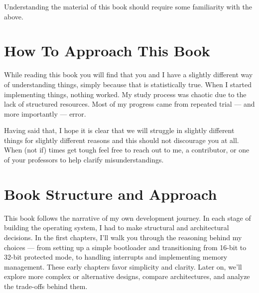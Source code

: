 Understanding the material of this book should require some familiarity with the above.

\section{How To Approach This Book}

While reading this book you will find that you and I have a slightly different way of understanding things,
simply because that is statistically true. When I started implementing things, nothing worked. 
My study process was chaotic due to the lack of structured resources. Most of my progress came from repeated 
trial — and more importantly — error.

Having said that, I hope it is clear that we will struggle in slightly different things for slightly
different reasons and this should not discourage you at all. When (not if) times get tough feel free 
to reach out to me, a contributor, or one of your professors to help clarify misunderstandings.

\section{Book Structure and Approach}

This book follows the narrative of my own development journey. In each stage of building the operating 
system, I had to make structural and architectural decisions. In the first chapters, I’ll walk you through 
the reasoning behind my choices — from setting up a simple bootloader and transitioning from 16-bit to 
32-bit protected mode, to handling interrupts and implementing memory management. These early chapters 
favor simplicity and clarity. Later on, we’ll explore more complex or alternative designs, compare 
architectures, and analyze the trade-offs behind them.